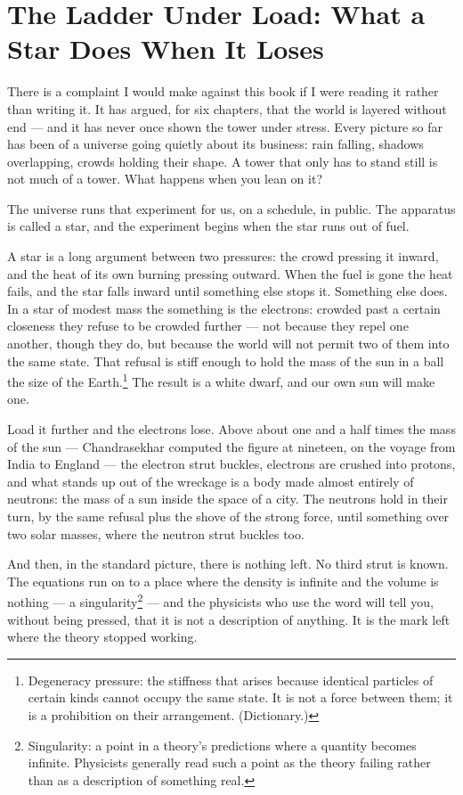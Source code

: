 \section{The Ladder Under Load: What a Star Does When It Loses}

There is a complaint I would make against this book if I were reading it rather than writing it. It has argued, for six chapters, that the world is layered without end --- and it has never once shown the tower under stress. Every picture so far has been of a universe going quietly about its business: rain falling, shadows overlapping, crowds holding their shape. A tower that only has to stand still is not much of a tower. What happens when you lean on it?

The universe runs that experiment for us, on a schedule, in public. The apparatus is called a star, and the experiment begins when the star runs out of fuel.

A star is a long argument between two pressures: the crowd pressing it inward, and the heat of its own burning pressing outward. When the fuel is gone the heat fails, and the star falls inward until something else stops it. Something else does. In a star of modest mass the something is the electrons: crowded past a certain closeness they refuse to be crowded further --- not because they repel one another, though they do, but because the world will not permit two of them into the same state. That refusal is stiff enough to hold the mass of the sun in a ball the size of the Earth.\footnote{Degeneracy pressure: the stiffness that arises because identical particles of certain kinds cannot occupy the same state. It is not a force between them; it is a prohibition on their arrangement. (Dictionary.)} The result is a white dwarf, and our own sun will make one.

Load it further and the electrons lose. Above about one and a half times the mass of the sun --- Chandrasekhar computed the figure at nineteen, on the voyage from India to England --- the electron strut buckles, electrons are crushed into protons, and what stands up out of the wreckage is a body made almost entirely of neutrons: the mass of a sun inside the space of a city. The neutrons hold in their turn, by the same refusal plus the shove of the strong force, until something over two solar masses, where the neutron strut buckles too.

And then, in the standard picture, there is nothing left. No third strut is known. The equations run on to a place where the density is infinite and the volume is nothing --- a singularity\footnote{Singularity: a point in a theory's predictions where a quantity becomes infinite. Physicists generally read such a point as the theory failing rather than as a description of something real.} --- and the physicists who use the word will tell you, without being pressed, that it is not a description of anything. It is the mark left where the theory stopped working.

